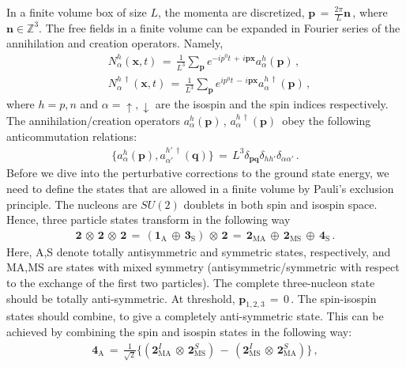 \documentclass[12pt,prd,tightenlines,nofootinbib]{revtex4-2}
\begin{document}
In a finite volume box of size $L$, the momenta are discretized, $\textbf{p} \, = \, \frac{2\pi}{L}\textbf{n}\,$, where $\textbf{n} \in \mathds{Z}^{3}$.
The free fields in a finite volume can be expanded in Fourier series of the annihilation and creation operators. Namely,
\begin{align}
    &N^h_\alpha (\textbf{x},t)\, = \, \frac{1}{L^{3}}\sum_{\textbf{p}}e^{-ip^{0}t \, +\, i\textbf{px}} a^h_\alpha (\textbf{p})\,,\nonumber\\
    &N^{h\, \dagger}_\alpha (\textbf{x},t)\, = \, \frac{1}{L^{3}}\sum_{\textbf{p}}e^{ip^{0}t \, -\, i\textbf{px}} a^{h\, \dagger}_\alpha (\textbf{p})\,,
\end{align}
where $h=p,n$ and $\alpha=\uparrow,\downarrow$
are the isospin and the spin indices respectively.
The annihilation/creation operators $a^h_\alpha(\textbf{p})\,$,
$a^{h\,\dagger}_\alpha(\textbf{p})\,$
obey the following anticommutation relations:
\begin{align}
  \{a^h_\alpha(\textbf{p}), a^{h'\,\dagger}_{\alpha'}(\textbf{q})\}\,
  = \, L^{3}\delta_{\textbf{pq}}\delta_{hh'}\delta_{\alpha\alpha'}\,.
\end{align}
Before we dive into the perturbative corrections to the ground state energy, we need to define the states that are allowed in a finite volume by Pauli's exclusion principle.
The nucleons are $SU(2)$ doublets in both spin and isospin space. Hence,
three particle states transform in the following way
\begin{align}
    \bm{2}\,\otimes\, \bm{2} \, \otimes\, \bm{2}\, = \, (\bm{1}_{\text{A}}\, \oplus\, \bm{3}_{\text{S}}) \, \otimes\, \bm{2}\,=\, \bm{2}_{\text{MA}} \, \oplus\, \bm{2}_{\text{MS}}\, \oplus\, \bm{4}_{\text{S}}\,.
\end{align}
Here, A,S denote totally antisymmetric and symmetric states, respectively,
and MA,MS are states with mixed symmetry (antisymmetric/symmetric
with respect to the exchange of the first two particles). 
The complete three-nucleon state should be totally anti-symmetric.
At threshold,  $\textbf{p}_{1,2,3}\,= \, 0\,$. The spin-isospin states should combine,
to give a completely anti-symmetric state. This can be achieved by combining
the spin and isospin states in the following way:
\begin{align}
     \bm{4}_{\text{A}}\, =\, \frac{1}{\sqrt{2}} \Big\{(\bm{2}^{I}_{\text{MA}}\, \otimes \, \bm{2}^{S}_{\text{MS}})\, -\,  (\bm{2}^{I}_{\text{MS}}\, \otimes \, \bm{2}^{S}_{\text{MA}})\Big\}\,,
\end{align}
\end{document}
